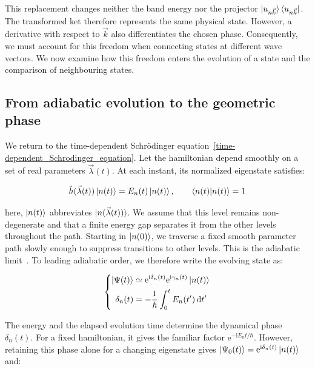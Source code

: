 This replacement changes neither the band energy nor the projector
$\ket{u_{n\vec{k}}}\bra{u_{n\vec{k}}}$.
The transformed ket therefore represents the same physical state.
However, a derivative with respect to $\vec{k}$ also differentiates the chosen phase.
Consequently, we must account for this freedom when connecting states at different wave vectors.
We now examine how this freedom enters the evolution of a state and the comparison of neighbouring states.

\subsection{From adiabatic evolution to the geometric phase}
\label{subsec:adiabatic_geometric_phase_appendix}

We return to the time-dependent Schrödinger equation~\eqref{time-dependent_Schrodinger_equation}.
Let the hamiltonian depend smoothly on a set of real parameters $\vec{\lambda}(t)$.
At each instant, its normalized eigenstate satisfies:

\begin{equation}
    \hat{h}(\vec{\lambda}(t))\ket{n(t)}=E_n(t)\ket{n(t)},
    \qquad \braket{n(t)|n(t)}=1
\label{instantaneous_eigenstate_berry_appendix}
\end{equation}

here, $\ket{n(t)}$ abbreviates $\ket{n(\vec{\lambda}(t))}$.
We assume that this level remains non-degenerate and that a finite energy gap separates it from the other levels throughout the path.
Starting in $\ket{n(0)}$, we traverse a fixed smooth parameter path slowly enough to suppress transitions to other levels.
This is the adiabatic limit~\cite{berry1984quantal,xiao2010berry}.
To leading adiabatic order, we therefore write the evolving state as:

\begin{equation}
\left\{\begin{aligned}
    \ket{\Psi(t)}
    &\simeq\mathrm{e}^{\mathrm{i}\delta_n(t)}
    \mathrm{e}^{\mathrm{i}\gamma_n(t)}\ket{n(t)} \\
    \delta_n(t)&=-\frac{1}{\hbar}\int_0^t E_n(t')\,\mathrm{d} t'
\end{aligned}\right.
\label{adiabatic_phase_separation_appendix}
\end{equation}

The energy and the elapsed evolution time determine the dynamical phase $\delta_n(t)$.
For a fixed hamiltonian, it gives the familiar factor $\mathrm{e}^{-\mathrm{i}E_nt/\hbar}$.
However, retaining this phase alone for a changing eigenstate gives
$\ket{\Psi_0(t)}=\mathrm{e}^{\mathrm{i}\delta_n(t)}\ket{n(t)}$ and:

